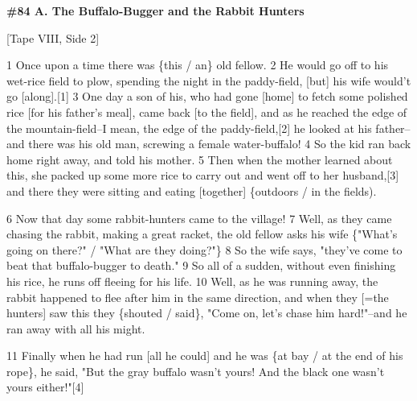 
\textbf{\#84 A. The Buffalo-Bugger and the Rabbit Hunters}

[Tape VIII, Side 2]

1 Once upon a time there was \{this / an\} old fellow. 2 He would go off to his
wet-rice field to plow, spending the night in the paddy-field, [but] his wife would't
go [along].[1] 3 One day a son of his, who had gone [home] to fetch some polished
rice [for his father's meal], came back [to the field], and as he reached the edge
of the mountain-field--I mean, the edge of the paddy-field,[2] he looked at his
father--and there was his old man, screwing a female water-buffalo! 4 So the kid
ran back home right away, and told his mother. 5 Then when the mother learned about
this, she packed up some more rice to carry out and went off to her husband,[3]
and there they were sitting and eating [together] \{outdoors / in the fields).

6 Now that day some rabbit-hunters came to the village! 7 Well, as they came chasing
the rabbit, making a great racket, the old fellow asks his wife \{"What's
going on there?" / "What are they doing?"\} 8 So the
wife says, "they've come to beat that buffalo-bugger to death."
9 So all of a sudden, without even finishing his rice, he runs off fleeing for
his life. 10 Well, as he was running away, the rabbit happened to flee after him
in the same direction, and when they [=the hunters] saw this they \{shouted / said\},
"Come on, let's chase him hard!"--and he ran away with all his
might.

11 Finally when he had run [all he could] and he was \{at bay / at the end of his
rope\}, he said, "But the gray buffalo wasn't yours! And the black one
wasn't yours either!"[4]

